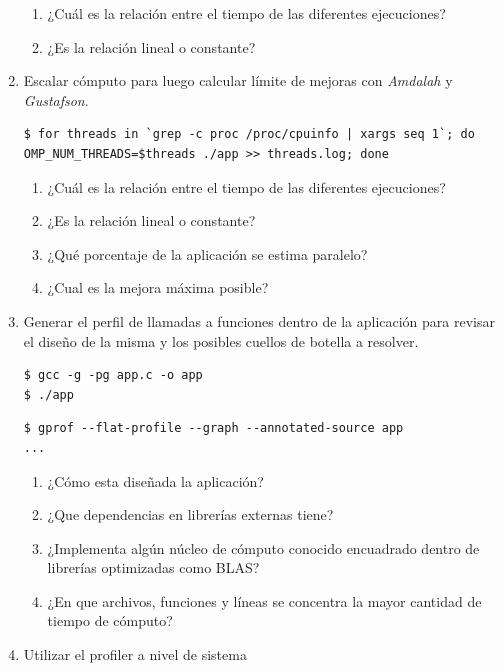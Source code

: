 \documentclass[a4paper]{report}
\begin{document}
\begin{enumerate}
\begin{enumerate}
\item ¿Cuál es la relación entre el tiempo de las diferentes ejecuciones?
\item ¿Es la relación lineal o constante?
\end{enumerate}

\item Escalar cómputo para luego calcular límite de mejoras con {\it Amdalah} y {\it Gustafson}.

\begin{lstlisting}
$ for threads in `grep -c proc /proc/cpuinfo | xargs seq 1`; do OMP_NUM_THREADS=$threads ./app >> threads.log; done
\end{lstlisting}

\begin{enumerate}
\item ¿Cuál es la relación entre el tiempo de las diferentes ejecuciones?
\item ¿Es la relación lineal o constante?
\item ¿Qué porcentaje de la aplicación se estima paralelo?
\item ¿Cual es la mejora máxima posible?
\end{enumerate}

\item Generar el perfil de llamadas a funciones dentro de la aplicación para revisar el diseño de la misma y los posibles cuellos de botella a resolver.

\begin{lstlisting}
$ gcc -g -pg app.c -o app
$ ./app
\end{lstlisting}

\begin{lstlisting}
$ gprof --flat-profile --graph --annotated-source app
...
\end{lstlisting}

\begin{enumerate}
\item ¿Cómo esta diseñada la aplicación?
\item ¿Que dependencias en librerías externas tiene?
\item ¿Implementa algún núcleo de cómputo conocido encuadrado dentro de librerías optimizadas como BLAS?
\item ¿En que archivos, funciones y líneas se concentra la mayor cantidad de tiempo de cómputo?
\end{enumerate}

\item Utilizar el profiler a nivel de sistema


\end{enumerate}
\end{document}
